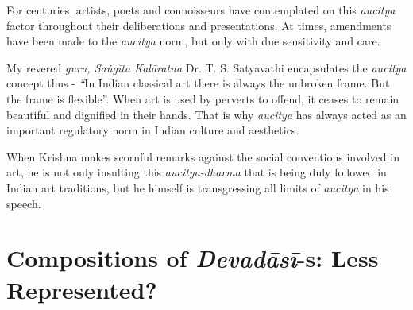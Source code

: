 For centuries, artists, poets and connoisseurs have contemplated on this \textit{aucitya} factor throughout their deliberations and presentations. At times, amendments have been made to the \textit{aucitya} norm, but only with due sensitivity and care.

My revered \textit{guru, Saṅgīta Kalāratna} Dr. T. S. Satyavathi encapsulates the \textit{aucitya} concept thus - \textit{“}In Indian classical art there is always the unbroken frame. But the frame is flexible”. When art is used by perverts to offend, it ceases to remain beautiful and dignified in their hands. That is why \textit{aucitya} has always acted as an important regulatory norm in Indian culture and aesthetics.

When Krishna makes scornful remarks against the social conventions involved in art, he is not only insulting this \textit{aucitya-dharma} that is being duly followed in Indian art traditions, but he himself is transgressing all limits of \textit{aucitya} in his speech.

\vspace{-.3cm}

\section*{\fontsize{13pt}{15pt}\selectfont Compositions of \textit{Devadāsī}-s: Less Represented?\relax}

